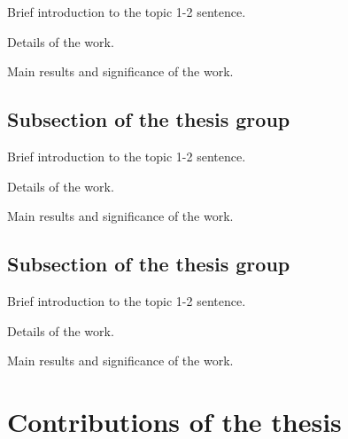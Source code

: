 \documentclass[12pt,a4paper]{extarticle}
\begin{document}

Brief introduction to the topic 1-2 sentence.

Details of the work.

Main results and significance of the work.

\subsection{Subsection of the thesis group}


Brief introduction to the topic 1-2 sentence.

Details of the work.

Main results and significance of the work.

\subsection{Subsection of the thesis group}


Brief introduction to the topic 1-2 sentence.

Details of the work.

Main results and significance of the work.

\vspace*{1em}

\section{Contributions of the thesis}
\end{document}
